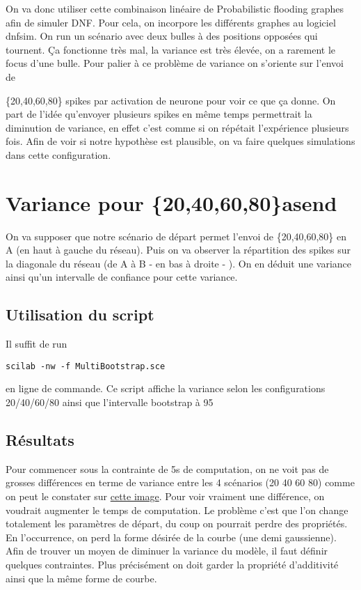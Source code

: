 \documentclass{report}
\begin{document}
On va donc utiliser cette combinaison linéaire de Probabilistic flooding graphes afin de simuler DNF. Pour cela, on incorpore les différents graphes au logiciel dnfsim. On run un scénario avec deux bulles à des positions opposées qui tournent. Ça fonctionne très mal, la variance est très élevée, on a rarement le focus d'une bulle. Pour palier à ce problème de variance on s'oriente sur l'envoi de {\{20,40,60,80\} spikes par activation de neurone pour voir ce que ça donne. On part de l'idée qu'envoyer plusieurs spikes en même temps permettrait la diminution de variance, en effet c'est comme si on répétait l'expérience plusieurs fois. Afin de voir si notre hypothèse est plausible, on va faire quelques simulations dans cette configuration.

\section{Variance pour \{20,40,60,80\}\textunderscore asend}

On va supposer que notre scénario de départ permet l'envoi de \{20,40,60,80\} en A (en haut à gauche du réseau). Puis on va observer la répartition des spikes sur la diagonale du réseau (de A à B - en bas à droite - ). On en déduit une variance ainsi qu'un intervalle de confiance pour cette variance.

\subsection{Utilisation du script}

Il suffit de run 

\begin{verbatim} 
scilab -nw -f MultiBootstrap.sce
\end{verbatim}
 en ligne de commande. Ce script affiche la variance selon les configurations 20/40/60/80 ainsi que l'intervalle bootstrap à 95%

\subsection{Résultats}

Pour commencer sous la contrainte de 5s de computation, on ne voit pas de grosses différences en terme de variance entre les 4 scénarios (20 40 60 80) comme on peut le constater sur \href{run:images/multibootstrap.png}{cette image}. Pour voir vraiment une différence, on voudrait augmenter le temps de computation. Le problème c'est que l'on change totalement les paramètres de départ, du coup on pourrait perdre des propriétés. En l'occurrence, on perd la forme désirée de la courbe (une demi gaussienne). Afin de trouver un moyen de diminuer la variance du modèle, il faut définir quelques contraintes. Plus précisément on doit garder la propriété d'additivité ainsi que la même forme de courbe.\\

}
\end{document}
